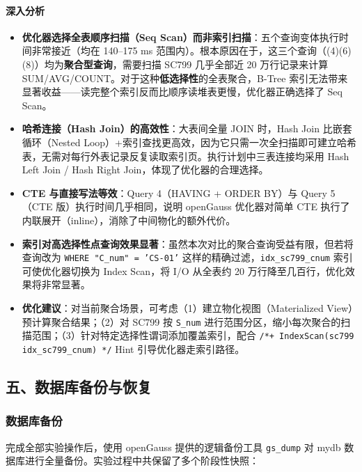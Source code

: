 \documentclass[12pt,a4paper]{ctexart}
\begin{document}
\paragraph{深入分析}

\begin{itemize}
  \item \textbf{优化器选择全表顺序扫描（Seq Scan）而非索引扫描}：五个查询变体执行时间非常接近（均在 140--175 ms 范围内）。根本原因在于，这三个查询（(4)(6)(8)）均为\textbf{聚合型查询}，需要扫描 SC799 几乎全部近 20 万行记录来计算 SUM/AVG/COUNT。对于这种\textbf{低选择性}的全表聚合，B-Tree 索引无法带来显著收益——读完整个索引反而比顺序读堆表更慢，优化器正确选择了 Seq Scan。

  \item \textbf{哈希连接（Hash Join）的高效性}：大表间全量 JOIN 时，Hash Join 比嵌套循环（Nested Loop）+索引查找更高效，因为它只需一次全扫描即可建立哈希表，无需对每行外表记录反复读取索引页。执行计划中三表连接均采用 Hash Left Join / Hash Right Join，体现了优化器的合理选择。

  \item \textbf{CTE 与直接写法等效}：Query 4（HAVING + ORDER BY）与 Query 5（CTE 版）执行时间几乎相同，说明 openGauss 优化器对简单 CTE 执行了内联展开（inline），消除了中间物化的额外代价。

  \item \textbf{索引对高选择性点查询效果显著}：虽然本次对比的聚合查询受益有限，但若将查询改为 \texttt{WHERE "C\_num" = 'CS-01'} 这样的精确过滤，\texttt{idx\_sc799\_cnum} 索引可使优化器切换为 Index Scan，将 I/O 从全表约 20 万行降至几百行，优化效果将非常显著。

  \item \textbf{优化建议}：对当前聚合场景，可考虑（1）建立物化视图（Materialized View）预计算聚合结果；（2）对 SC799 按 \texttt{S\_num} 进行范围分区，缩小每次聚合的扫描范围；（3）针对特定选择性谓词添加覆盖索引，配合 \texttt{/*+ IndexScan(sc799 idx\_sc799\_cnum) */} Hint 引导优化器走索引路径。
\end{itemize}

\subsection{五、数据库备份与恢复}

\subsubsection{数据库备份}

完成全部实验操作后，使用 openGauss 提供的逻辑备份工具 \texttt{gs\_dump} 对 mydb 数据库进行全量备份。实验过程中共保留了多个阶段性快照：
\end{document}
